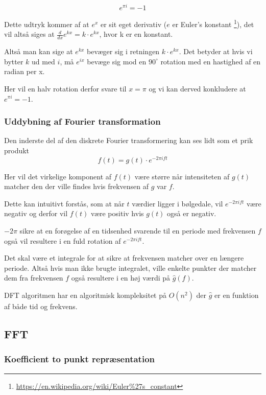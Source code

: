 \documentclass[11pt,a4paper]{article}
\begin{document}
$$
e^{\pi i} = -1
$$

Dette udtryk kommer af at \(e^x\) er sit eget derivativ (\(e\) er Euler's konstant \footnote{\url{https://en.wikipedia.org/wiki/Euler\%27s\_constant}}),
det vil altså siges at \(\frac{d}{dx}e^{kx} = k\cdot e^{kx}\), hvor k er en konstant.

Altså man kan sige at \(e^{kx}\) bevæger sig i retningen \(k \cdot e^{kx}\).
Det betyder at hvis vi bytter \(k\) ud med \(i\), må \(e^{ix}\) bevæge sig mod en \(90^\circ\) rotation med en hastighed af en radian per x.

Her vil en halv rotation derfor svare til \(x=\pi\) og vi kan derved konkludere at \(e^{\pi i} = -1\).

\subsubsection{Uddybning af Fourier transformation}
\label{sec:org12e3098}

Den inderste del af den diskrete Fourier transformering kan ses lidt som et prik produkt
$$
f(t) = g(t) \cdot e ^{-2\pi ift}
$$

Her vil det virkelige komponent af \(f(t)\) være større når intensiteten af \(g(t)\)
matcher den der ville findes hvis frekvensen af \(g\) var \(f\).

Dette kan intuitivt forstås, som at når \(t\) værdier ligger i bølgedale, vil \(e^{-2\pi ift}\) være negativ
og derfor vil \(f(t)\) være positiv hvis \(g(t)\) også er negativ.

\(-2\pi\) sikre at en forøgelse af en tidsenhed svarende til en periode med frekvensen \(f\) også vil resultere
i en fuld rotation af \(e^{-2\pi ift}\).

Det skal være et integrale for at sikre at frekvensen matcher over en længere periode.
Altså hvis man ikke brugte integralet,
ville enkelte punkter der matcher dem fra frekvensen \(f\) også resultere i en høj værdi på \(\hat{g}(f)\).

\bigskip

DFT algoritmen har en algoritmisk kompleksitet på \(O(n^2)\) der \(\hat{g}\) er en funktion af både tid og frekvens.

\newpage

\subsection{FFT}
\label{sec:org664a851}

\subsubsection{Koefficient to punkt repræsentation}
\label{sec:org9b398b8}
\end{document}
